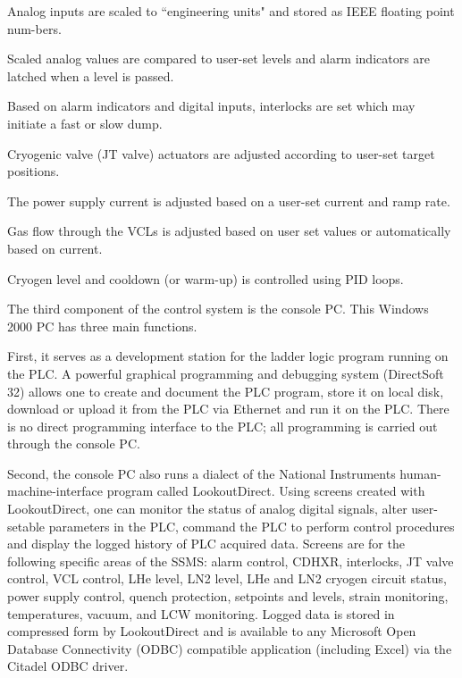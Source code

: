 {\begin{list}{--}{\setlength{\itemsep}{0.cm}}
\item Analog inputs are scaled to ``engineering units" and stored as IEEE floating point num-bers.

\item Scaled analog values are compared to user-set levels and alarm indicators are latched when a level is passed.

\item Based on alarm indicators and digital inputs, interlocks are set which may initiate a fast or slow dump.

\item Cryogenic valve (JT valve) actuators are adjusted according to user-set target positions.

\item The power supply current is adjusted based on a user-set current and ramp rate.

\item Gas flow through the VCLs is adjusted based on user set values or automatically based on current.

\item Cryogen level and cooldown (or warm-up) is controlled using PID loops.
\end{list}

The third component of the control system is the console PC.  This Windows 2000 PC has three main functions.

\begin{list}{--}{\setlength{\itemsep}{0.cm}}
\item First, it serves as a development station for the ladder logic program running on the PLC.  A powerful 
graphical programming and debugging system (DirectSoft 32) allows one to create and document the PLC program, 
store it on local disk, download or upload it from the PLC via Ethernet and run it on the PLC.  There is no 
direct programming interface to the PLC; all programming is carried out through the console PC.

\item Second, the console PC also runs a dialect of the National Instruments human-machine-interface program 
called LookoutDirect.  Using screens created with LookoutDirect, one can monitor the status of analog digital 
signals, alter user-setable parameters in the PLC, command the PLC to perform control procedures and display 
the logged history of PLC acquired data.  Screens are for the following specific areas of the SSMS: alarm 
control, CDHXR, interlocks, JT valve control, VCL control, LHe level, LN2 level, LHe and LN2 cryogen circuit 
status, power supply control, quench protection, setpoints and levels, strain monitoring, temperatures, vacuum, 
and LCW monitoring.  Logged data is stored in compressed form by LookoutDirect and is available to any 
Microsoft Open Database Connectivity (ODBC) compatible application (including Excel) via the Citadel ODBC driver.


\end{list}}
